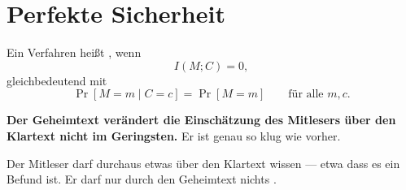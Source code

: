 \section{Perfekte Sicherheit}

\begin{definition}
Ein Verfahren heißt , wenn
\[ I(M;C) = 0 , \]
gleichbedeutend mit
\[ \Pr[M=m \mid C=c] = \Pr[M=m] \qquad\text{für alle } m,c . \]
\end{definition}

\begin{merksatz}
\begin{center}
\begin{minipage}{0.9\textwidth}
\textbf{Der Geheimtext verändert die Einschätzung des Mitlesers über den Klartext nicht im Geringsten.} Er ist genau so klug wie vorher.
\end{minipage}
\end{center}

\begin{center}
\begin{minipage}{0.88\textwidth}
\end{minipage}
\end{center}

Der Mitleser darf durchaus etwas über den Klartext wissen --- etwa dass es ein Befund ist. Er darf nur durch den Geheimtext nichts .
\end{merksatz}

